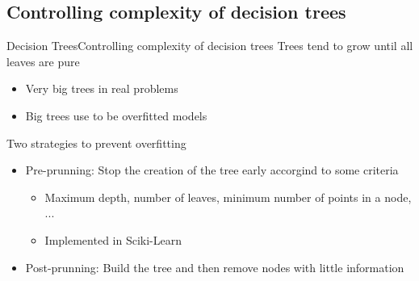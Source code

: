 \documentclass[10pt,compress]{beamer} %
\begin{document}

\subsection{Controlling complexity of decision trees}

\begin{frame}{Decision Trees}{Controlling complexity of decision trees}
    Trees tend to grow until all leaves are pure
    \begin{itemize}
        \item Very big trees in real problems
        \item Big trees use to be overfitted models
    \end{itemize}

    Two strategies to prevent overfitting 
    \begin{itemize}
        \item Pre-prunning: Stop the creation of the tree early accorgind to some criteria
            \begin{itemize}
                \item Maximum depth, number of leaves, minimum number of points in a node, ...
                \item Implemented in Sciki-Learn
            \end{itemize}
        \item Post-prunning: Build the tree and then remove nodes with little information
    \end{itemize}

\end{frame}
\end{document}
